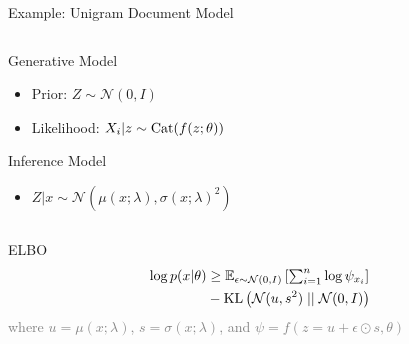 \begin{frame}{Example: Unigram Document Model}

\begin{columns}
	\begin{column}{0.75\textwidth}  

		Generative Model
		\begin{itemize}
			\item Prior: $Z \sim \mathcal N(0, I)$
			\item Likelihood: $X_i|z \sim \operatorname{Cat}(f(z; \theta))$
		\end{itemize}
   		Inference Model
		\begin{itemize}
			\item $Z|x \sim \mathcal N(\mu(x; \lambda), \sigma(x; \lambda)^2)$
		\end{itemize}
    \end{column}
	\begin{column}{0.2\textwidth}
    \end{column}    
    \end{columns}
    \pause
    
    \vspace{10pt}
    
    \alert{ELBO}
    \vspace{-10pt}
	\begin{equation*}
	\begin{aligned}		
		\log p(x|\theta) &\ge \mathbb E_{\epsilon \sim \mathcal N(0, I)}\left[ \textstyle\sum_{i=1}^n \log \psi_{x_i}\right] \\
		&- \operatorname{KL}\left(\mathcal N(u, s^2)\mid\mid \mathcal N(0, I)\right)
	\end{aligned}
	\end{equation*}
	\textcolor{gray}{{\small where $u = \mu(x; \lambda)$, $s = \sigma(x; \lambda)$, and $\psi = f(z = u + \epsilon \odot s, \theta)$ }}

\end{frame}

